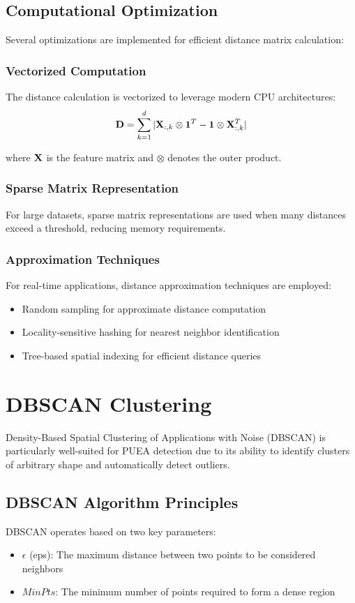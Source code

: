 \subsection{Computational Optimization}
Several optimizations are implemented for efficient distance matrix calculation:

\subsubsection{Vectorized Computation}
The distance calculation is vectorized to leverage modern CPU architectures:
\begin{equation}
\mathbf{D} = \sum_{k=1}^{d} |\mathbf{X}_{:,k} \otimes \mathbf{1}^T - \mathbf{1} \otimes \mathbf{X}_{:,k}^T|
\end{equation}

where $\mathbf{X}$ is the feature matrix and $\otimes$ denotes the outer product.

\subsubsection{Sparse Matrix Representation}
For large datasets, sparse matrix representations are used when many distances exceed a threshold, reducing memory requirements.

\subsubsection{Approximation Techniques}
For real-time applications, distance approximation techniques are employed:
\begin{itemize}
\item Random sampling for approximate distance computation
\item Locality-sensitive hashing for nearest neighbor identification
\item Tree-based spatial indexing for efficient distance queries
\end{itemize}

\section{DBSCAN Clustering}
Density-Based Spatial Clustering of Applications with Noise (DBSCAN) is particularly well-suited for PUEA detection due to its ability to identify clusters of arbitrary shape and automatically detect outliers.

\subsection{DBSCAN Algorithm Principles}
DBSCAN operates based on two key parameters:
\begin{itemize}
\item $\epsilon$ (eps): The maximum distance between two points to be considered neighbors
\item $MinPts$: The minimum number of points required to form a dense region
\end{itemize}


